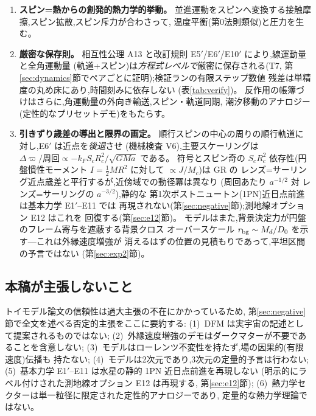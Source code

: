 \documentclass[a4paper,10pt,twocolumn]{ltjsarticle}
\newcommand{\Dz}{D_0}
\begin{document}
\begin{enumerate}
\item[C6.]{\bf スピン=熱からの創発的熱力学的挙動。}
並進運動をスピンへ変換する接触摩擦,スピン拡散,スピン斥力が合わさって,
温度平衡(第0法則類似)と圧力を生む。

\item[C7.]{\bf 厳密な保存則。}
相互性公理 A13 と改訂規則 E5$'$/E6$'$/E10$'$ により,線運動量と全角運動量
(軌道+スピン)は\emph{方程式レベルで}厳密に保存される(T7,
第\ref{sec:dynamics}節でペアごとに証明);検証ランの有限ステップ数値
残差は単精度の丸め床にあり,時間刻みに依存しない
(表\ref{tab:verify})。
反作用の帳簿づけはさらに,角運動量の外向き輸送,スピン・軌道同期,
潮汐移動のアナロジー(定性的なプリセットデモ)をもたらす。

\item[C8.]{\bf 引きずり歳差の導出と限界の画定。}
順行スピンの中心の周りの順行軌道に対し,E6$'$ は近点を\emph{後退}させ
(機械検査 V6),主要スケーリングは
$\Delta\varpi/\text{周回} \propto -k_F S_c R_c^2/\sqrt{GMa}$ である。
符号とスピン奇の $S_cR_c^2$ 依存性(円盤慣性モーメント
$I = \tfrac12 M R^2$ に対して $\propto J/M_c$)は GR の
レンズ=サーリング近点歳差と平行するが,近傍域での動径冪は異なり
(周回あたり $a^{-1/2}$ 対 レンズ=サーリングの $a^{-3/2}$),静的な
第1次ポストニュートン(1PN)近日点前進は基本力学 E1$'$--E11 では
再現されない(第\ref{sec:negative}節);測地線オプション E12 はこれを
回復する(第\ref{sec:e12}節)。
モデルはまた,背景決定力が円盤のフレーム寄与を遮蔽する背景クロス
オーバースケール $r_{\rm bg} \sim M_d/\Dz$ を示す---これは外縁速度増強が
消えるはずの位置の見積もりであって,平坦区間の予言ではない
(第\ref{sec:exp2}節)。
\end{enumerate}

\subsection{本稿が主張しないこと}
\label{sec:nc-summary}

トイモデル論文の信頼性は過大主張の不在にかかっているため,
第\ref{sec:negative}節で全文を述べる否定的主張をここに要約する:
(1)~DFM は実宇宙の記述として提案されるものではない;
(2)~外縁速度増強のデモはダークマターが不要であることを含意しない;
(3)~モデルはローレンツ不変性を持たず,場の因果的(有限速度)伝播も
持たない;
(4)~モデルは2次元であり,3次元の定量的予言は行わない;
(5)~基本力学 E1$'$--E11 は水星の静的 1PN 近日点前進を再現しない
(明示的にラベル付けされた測地線オプション E12 は再現する,
第\ref{sec:e12}節);
(6)~熱力学セクターは単一粒径に限定された定性的アナロジーであり,
定量的な熱力学理論ではない。
\end{document}
